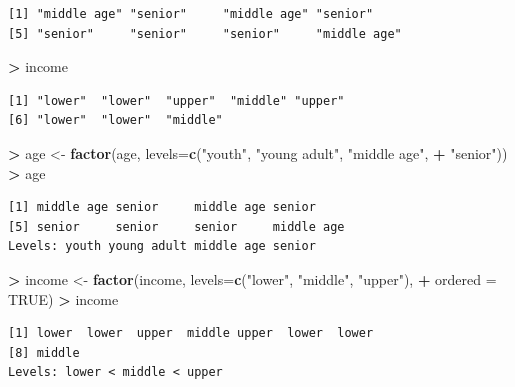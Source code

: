 \documentclass[
]{krantz}
\makeatletter
\newenvironment{Shaded}{\begin{snugshade}}{\end{snugshade}}
\newcommand{\DataTypeTok}[1]{\textcolor[rgb]{0.27,0.27,0.27}{#1}}
\newcommand{\KeywordTok}[1]{\textcolor[rgb]{0.27,0.27,0.27}{\textbf{#1}}}
\newcommand{\NormalTok}[1]{#1}
\newcommand{\OperatorTok}[1]{\textcolor[rgb]{0.43,0.43,0.43}{\textbf{#1}}}
\newcommand{\OtherTok}[1]{\textcolor[rgb]{0.37,0.37,0.37}{#1}}
\newcommand{\StringTok}[1]{\textcolor[rgb]{0.5,0.5,0.5}{#1}}
\newenvironment{kframe}{%
\medskip{}
\setlength{\fboxsep}{.8em}
 \def\at@end@of@kframe{}%
 \ifinner\ifhmode%
  \def\at@end@of@kframe{\end{minipage}}%
  \begin{minipage}{\columnwidth}%
 \fi\fi%
 \def\FrameCommand##1{\hskip\@totalleftmargin \hskip-\fboxsep
 \colorbox{shadecolor}{##1}\hskip-\fboxsep
     \hskip-\linewidth \hskip-\@totalleftmargin \hskip\columnwidth}%
 \MakeFramed {\advance\hsize-\width
   \@totalleftmargin\z@ \linewidth\hsize
   \@setminipage}}%
 {\par\unskip\endMakeFramed%
 \at@end@of@kframe}
\renewenvironment{Shaded}{\begin{kframe}}{\end{kframe}}
\makeatother
\begin{document}
\begin{verbatim}
[1] "middle age" "senior"     "middle age" "senior"    
[5] "senior"     "senior"     "senior"     "middle age"
\end{verbatim}

\begin{Shaded}
\begin{Highlighting}[]
\OperatorTok{\textgreater{}}\StringTok{ }\NormalTok{income}
\end{Highlighting}
\end{Shaded}

\begin{verbatim}
[1] "lower"  "lower"  "upper"  "middle" "upper" 
[6] "lower"  "lower"  "middle"
\end{verbatim}

\begin{Shaded}
\begin{Highlighting}[]
\OperatorTok{\textgreater{}}\StringTok{ }\NormalTok{age \textless{}{-}}\StringTok{ }\KeywordTok{factor}\NormalTok{(age, }\DataTypeTok{levels=}\KeywordTok{c}\NormalTok{(}\StringTok{"youth"}\NormalTok{, }\StringTok{"young adult"}\NormalTok{, }\StringTok{"middle age"}\NormalTok{,}
\OperatorTok{+}\StringTok{                             "senior"}\NormalTok{))}
\OperatorTok{\textgreater{}}\StringTok{ }\NormalTok{age}
\end{Highlighting}
\end{Shaded}

\begin{verbatim}
[1] middle age senior     middle age senior    
[5] senior     senior     senior     middle age
Levels: youth young adult middle age senior
\end{verbatim}

\begin{Shaded}
\begin{Highlighting}[]
\OperatorTok{\textgreater{}}\StringTok{ }\NormalTok{income \textless{}{-}}\StringTok{ }\KeywordTok{factor}\NormalTok{(income, }\DataTypeTok{levels=}\KeywordTok{c}\NormalTok{(}\StringTok{"lower"}\NormalTok{, }\StringTok{"middle"}\NormalTok{, }\StringTok{"upper"}\NormalTok{),}
\OperatorTok{+}\StringTok{                  }\DataTypeTok{ordered =} \OtherTok{TRUE}\NormalTok{)}
\OperatorTok{\textgreater{}}\StringTok{ }\NormalTok{income}
\end{Highlighting}
\end{Shaded}

\begin{verbatim}
[1] lower  lower  upper  middle upper  lower  lower 
[8] middle
Levels: lower < middle < upper
\end{verbatim}
\end{document}
